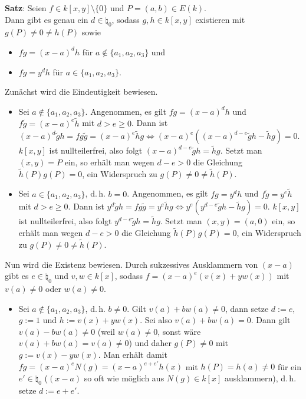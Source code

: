 \textbf{Satz}:
Seien $f \in k[x, y] \setminus \{0\}$ und $P = (a, b) \in E(k)$.\\
Dann gibt es genau ein $d \in \natural_0$, sodass $g, h \in k[x, y]$ existieren mit
$g(P) \not= 0 \not= h(P)$ sowie
\begin{itemize}
    \item
    $fg = (x - a)^d h$ für $a \notin \{a_1, a_2, a_3\}$ und
    
    \item
    $fg = y^d h$ für $a \in \{a_1, a_2, a_3\}$.
\end{itemize}

\begin{Beweis}
    Zunächst wird die Eindeutigkeit bewiesen.
    \begin{itemize}
        \item
        Sei $a \notin \{a_1, a_2, a_3\}$.
        Angenommen, es gilt $fg = (x - a)^d h$ und $f\widetilde{g} = (x - a)^e \widetilde{h}$
        mit $d > e \ge 0$.
        Dann ist $(x - a)^d \widetilde{g} h = fg\widetilde{g} = (x - a)^e \widetilde{h} g \iff
        (x - a)^e ((x - a)^{d-e} \widetilde{g} h - \widetilde{h} g) = 0$.
        $k[x, y]$ ist nullteilerfrei, also folgt
        $(x - a)^{d-e} \widetilde{g} h = \widetilde{h} g$.
        Setzt man $(x, y) = P$ ein, so erhält man wegen $d - e > 0$ die Gleichung
        $\widetilde{h}(P) g(P) = 0$, ein Widerspruch zu
        $g(P) \not= 0 \not= \widetilde{h}(P)$.
        
        \item
        Sei $a \in \{a_1, a_2, a_3\}$, d.\,h. $b = 0$.
        Angenommen, es gilt $fg = y^d h$ und $f\widetilde{g} = y^e \widetilde{h}$
        mit $d > e \ge 0$.
        Dann ist $y^d \widetilde{g} h = fg\widetilde{g} = y^e \widetilde{h} g \iff
        y^e (y^{d-e} \widetilde{g} h - \widetilde{h} g) = 0$.
        $k[x, y]$ ist nullteilerfrei, also folgt
        $y^{d-e} \widetilde{g} h = \widetilde{h} g$.
        Setzt man $(x, y) = (a, 0)$ ein, so erhält man wegen $d - e > 0$ die Gleichung
        $\widetilde{h}(P) g(P) = 0$, ein Widerspruch zu
        $g(P) \not= 0 \not= \widetilde{h}(P)$.
    \end{itemize}
    
    Nun wird die Existenz bewiesen.
    Durch sukzessives Ausklammern von $(x - a)$
    gibt es $e \in \natural_0$ und $v, w \in k[x]$, sodass
    $f = (x - a)^e (v(x) + y w(x))$ mit $v(a) \not= 0$ oder $w(a) \not= 0$.
    \begin{itemize}
        \item
        Sei $a \notin \{a_1, a_2, a_3\}$, d.\,h. $b \not= 0$.
        Gilt $v(a) + bw(a) \not= 0$, dann setze $d := e$, $g := 1$ und $h := v(x) + yw(x)$.
        Sei also $v(a) + bw(a) = 0$.
        Dann gilt $v(a) - bw(a) \not= 0$
        (weil $w(a) \not= 0$, sonst wäre $v(a) + bw(a) = v(a) \not= 0$) und
        daher $g(P) \not= 0$ mit $g := v(x) - yw(x)$.
        Man erhält damit
        $fg = (x - a)^e N(g) = (x - a)^{e+e'} h(x)$ mit $h(P) = h(a) \not= 0$ für ein
        $e' \in \natural_0$
        ($(x - a)$ so oft wie möglich aus $N(g) \in k[x]$ ausklammern),
        d.\,h. setze $d := e + e'$.
        

\end{itemize}
\end{Beweis}
